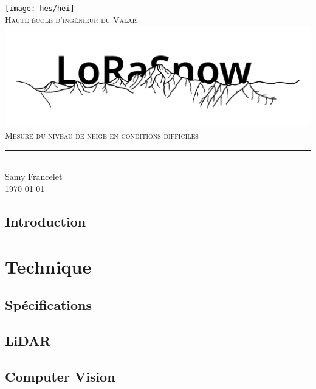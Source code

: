 \documentclass[11pt,titlepage]{report}
\begin{document}
\begin{titlepage}
	\centering
    \texttt{[image: hes/hei]}\\[1cm] 	%
    \textsc{\LARGE Haute école d'ingénieur du Valais}\\ \vspace{\fill}
    \includegraphics[width=1\linewidth]{Images/Logo_LoRaSnow.png}\\ \vspace{\fill}
	\textsc{\LARGE Mesure du niveau de neige en conditions difficiles}\\[0.4cm]
	\rule{\linewidth}{0.2 mm} \\[0.5 cm]
	Samy Francelet \\
	\today
\end{titlepage}
\restoregeometry

\tableofcontents
\listoffigures
\listoftables
\pagestyle{fancy}

\chapter{Introduction}


\part{Technique}

\chapter{Spécifications}


\chapter{LiDAR}



\chapter{Computer Vision}



\end{document}
